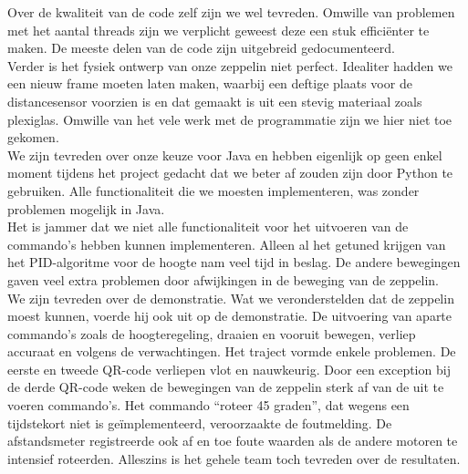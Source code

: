 \documentclass[eind]{penoverslag}
\begin{document}
Over de kwaliteit van de code zelf zijn we wel tevreden. Omwille van problemen met het aantal threads zijn we verplicht geweest deze een stuk effici\"enter te maken. De meeste delen van de code zijn uitgebreid gedocumenteerd. \\

Verder is het fysiek ontwerp van onze zeppelin niet perfect. Idealiter hadden we een nieuw frame moeten laten maken, waarbij een deftige plaats voor de distancesensor voorzien is en dat gemaakt is uit een stevig materiaal zoals plexiglas. Omwille van het vele werk met de programmatie zijn we hier niet toe gekomen. \\

We zijn tevreden over onze keuze voor Java en hebben eigenlijk op geen enkel moment tijdens het project gedacht dat we beter af zouden zijn door Python te gebruiken. Alle functionaliteit die we moesten implementeren, was zonder problemen mogelijk in Java. \\

Het is jammer dat we niet alle functionaliteit voor het uitvoeren van de commando's hebben kunnen implementeren. Alleen al het getuned krijgen van het PID-algoritme voor de hoogte nam veel tijd in beslag. De andere bewegingen gaven veel extra problemen door afwijkingen in de beweging van de zeppelin. \\

We zijn tevreden over de demonstratie. Wat we veronderstelden dat de zeppelin moest kunnen, voerde hij ook uit op de demonstratie. De uitvoering van aparte commando’s zoals de hoogteregeling, draaien en vooruit bewegen, verliep accuraat en volgens de verwachtingen. Het traject vormde enkele problemen. De eerste en tweede QR-code verliepen vlot en nauwkeurig. Door een exception bij de derde QR-code weken de bewegingen van de zeppelin sterk af van de uit te voeren commando’s. Het commando ``roteer 45 graden'', dat wegens een tijdstekort niet is ge\"implementeerd, veroorzaakte de foutmelding. De afstandsmeter registreerde ook af en toe foute waarden als de andere motoren te intensief roteerden.  Alleszins is het gehele team toch tevreden over de resultaten. 
\end{document}
